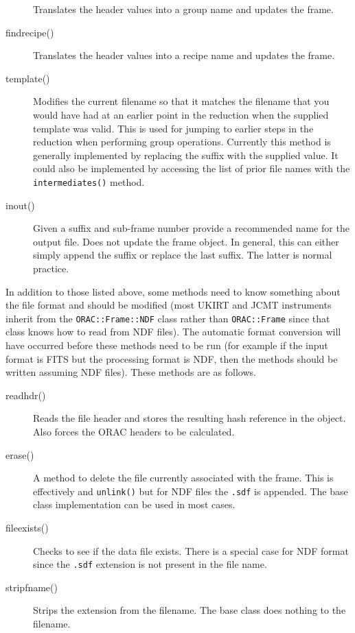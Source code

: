 \documentclass[twoside,11pt]{article}
\renewcommand{\_}{\texttt{\symbol{95}}}
\begin{document}
\begin{description}
Translates the header values into a group name and updates the frame.

\item[findrecipe()] \mbox{}

Translates the header values into a recipe name and updates the frame.

\item[template()] \mbox{}

Modifies the current filename so that it matches the filename that you 
would have had at an earlier point in the reduction when the
supplied template was valid. This is used for jumping to earlier steps
in the reduction when performing group operations.
Currently this method is generally
implemented by replacing the suffix with the supplied value. It could
also be implemented by accessing the list of prior file names with the
\texttt{intermediates()} method.

\item[inout()] \mbox{}

Given a suffix and sub-frame number provide a recommended name for the 
output file. Does not update the frame object. In general, this can
either simply append the suffix or replace the last suffix. The latter 
is normal practice.

\end{description}

In addition to those listed above, some methods need to know something
about the file format and should be modified (most UKIRT and JCMT
instruments inherit from the \texttt{ORAC::Frame::NDF} class rather
than \texttt{ORAC::Frame} since that class knows how to read from NDF
files). The automatic format conversion will have occurred before
these methods need to be run (for example if the input format is FITS
but the processing format is NDF, then the methods should be written
assuming NDF files). These methods are as follows.

\begin{description}

\item[readhdr()] \mbox{}

Reads the file header and stores the resulting hash reference in the
object. Also forces the ORAC headers to be calculated.

\item[erase()] \mbox{}

A method to delete the file currently associated with the frame. This
is effectively and \texttt{unlink()} but for NDF files the
\texttt{.sdf} is appended. The base class implementation can be used
in most cases.

\item[file\_exists()] \mbox{}

Checks to see if the data file exists. There is a special case for NDF format
since the \texttt{.sdf} extension is not present in the file name.

\item[stripfname()] \mbox{}

Strips the extension from the filename. The base class does nothing to 
the filename.

\end{description}
\end{document}

